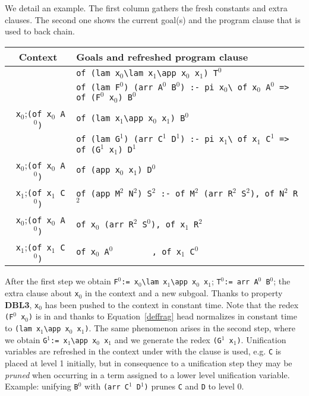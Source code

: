 \documentclass{llncs}
\begin{document}
We detail an example.\label{detailed}
The first column gathers the fresh constants and extra clauses. The
second one shows the current goal(s) and the program clause that is
used to back chain.

\begin{center}
\small
\begin{tabular}{c|l}
Context & Goals and refreshed program clause \\\hline
& \verb+of (lam x+$_0$\verb+\lam x+$_1$\verb+\app x+$_0$\verb+ x+$_1$\verb+) T+$^0$ \\
& \verb+of (lam F+$^0$\verb+) (arr A+$^0$\verb+ B+$^0$\verb+) :- pi x+$_0$\verb+\ of x+$_0$\verb+ A+$^0$\verb+ => of (F+$^0$\verb+ x+$_0$\verb+) B+$^0$ \\\hline
\verb+ x+$_0$;\verb+(of x+$_0$\verb+ A+$^0$\verb+)+ & \verb+of (lam x+$_1$\verb+\app x+$_0$\verb+ x+$_1$\verb+) B+$^0$ \\
& \verb+of (lam G+$^1$\verb+) (arr C+$^1$\verb+ D+$^1$\verb+) :- pi x+$_1$\verb+\ of x+$_1$\verb+ C+$^1$\verb+ => of (G+$^1$\verb+ x+$_1$\verb+) D+$^1$\verb++ \\\hline
\verb+ x+$_0$;\verb+(of x+$_0$\verb+ A+$^0$\verb+)+ & \verb+of (app x+$_0$\verb+ x+$_1$\verb+) D+$^0$ \\
\verb+ x+$_1$;\verb+(of x+$_1$\verb+ C+$^0$\verb+)+ & \verb+of (app M+$^2$\verb+ N+$^2$\verb+) S+$^2$\verb+ :- of M+$^2$\verb+ (arr R+$^2$\verb+ S+$^2$\verb+), of N+$^2$\verb+ R+$^2$ \\\hline
\verb+ x+$_0$;\verb+(of x+$_0$\verb+ A+$^0$\verb+)+ & \verb+of x+$_0$\verb+ (arr R+$^2$\verb+ S+$^0$\verb+), of x+$_1$\verb+ R+$^2$ \\
\verb+ x+$_1$;\verb+(of x+$_1$\verb+ C+$^0$\verb+)+ & \verb+of x+$_0$\verb+ A+$^0$\hspace{4pt}\verb+        , of x+$_1$\verb+ C+$^0$ \\\hline
\end{tabular}
\end{center}

After the first step we obtain
\verb+F+$^0$\verb+:= x+$_0$\verb+\lam x+$_1$\verb+\app x+$_0$\verb+ x+$_1$;
\verb+T+$^0$\verb+:= arr A+$^0$\verb+ B+$^0$; the extra clause
about \verb+x+$_0$ in the context and a new subgoal.
Thanks to property \textbf{DBL3}, \verb+x+$_0$ has been pushed to the context
in constant time.
Note that the redex \verb+(F+$^0$\verb+ x+$_0$\verb+)+ is in \rff{} and
thanks to Equation~\ref{deffrag} head normalizes in constant time
to \verb+(lam x+$_1$\verb+\app x+$_0$\verb+ x+$_1$\verb+)+.
The same phenomenon arises in the second step,
where we obtain \verb+G+$^1$\verb+:= x+$_1$\verb+\app x+$_0$\verb+ x+$_1$
and we generate the redex \verb+(G+$^1$\verb+ x+$_1$\verb+)+.
Unification variables are refreshed in the context under with
the clause is used, e.g. \verb+C+ is placed at level 1 initially,
but in consequence to a unification step they may be \emph{pruned}
when occurring in a term assigned to a lower level unification
variable. Example: unifying
\verb+B+$^0$ with \verb+(arr C+$^1$\verb+ D+$^1$\verb+)+ prunes
\verb+C+ and \verb+D+ to level 0.
\end{document}
